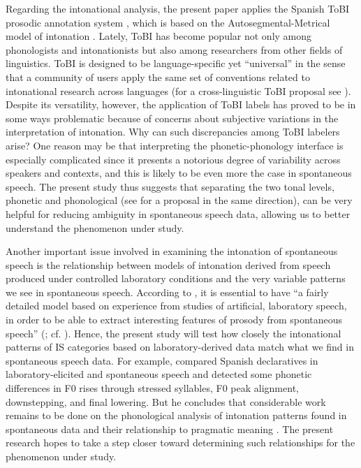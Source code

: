 \documentclass[output=paper]{langsci/langscibook}
\begin{document}
Regarding the intonational analysis, the present paper applies the Spanish ToBI prosodic annotation system \citep{Aguilar.2009}, which is based on the Autosegmental-Metrical model of intonation \citep{Pierrehumbert1980}. Lately, ToBI has become popular not only among phonologists and intonationists but also among researchers from other fields of linguistics. ToBI is designed to be language-specific yet ``universal'' in the sense that a community of users apply the same set of conventions related to intonational research across languages (for a cross-linguistic ToBI proposal see \citealt{Hualde2016}). Despite its versatility, however, the application of ToBI labels has proved to be in some ways problematic because of concerns about subjective variations in the interpretation of intonation. Why can such discrepancies among ToBI labelers arise? One reason may be that interpreting the phonetic-phonology interface is especially complicated since it presents a notorious degree of variability across speakers and contexts, and this is likely to be even more the case in spontaneous speech. The present study thus suggests that separating the two tonal levels, phonetic and phonological (see \citealt{Hualde2016} for a proposal in the same direction), can be very helpful for reducing ambiguity in spontaneous speech data, allowing us to better understand the phenomenon under study. 

Another important issue involved in examining the intonation of spontaneous speech is the relationship between models of intonation derived from speech produced under controlled laboratory conditions and the very variable patterns we see in spontaneous speech. According to \citet[37]{Bruce1990}, it is essential to have ``a fairly detailed model based on experience from studies of artificial, laboratory speech, in order to be able to extract interesting features of prosody from spontaneous speech'' (\citealt[37]{Bruce1990}; cf. \citealt{Face2003}). Hence, the present study will test how closely the intonational patterns of IS categories based on laboratory-derived data match what we find in spontaneous speech data. For example, \citet{Face2003} compared Spanish declaratives in laboratory-elicited and spontaneous speech and detected some phonetic differences in F0 rises through stressed syllables, F0 peak alignment, downstepping, and final lowering. But he concludes that considerable work remains to be done on the phonological analysis of intonation patterns found in spontaneous data and their relationship to pragmatic meaning \citep[129]{Face2003}. The present research hopes to take a step closer toward determining such relationships for the phenomenon under study.
\end{document}

